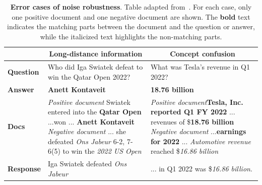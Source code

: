 \documentclass{DESSThesis}
\begin{document}
\begin{table}[h]
    \centering
    \small
    \begin{tabular}{p{1.5cm}|p{6cm}|p{6cm}}
    \toprule
    \multicolumn{1}{c|}{} & \multicolumn{1}{c|}{\textbf{Long-distance information}} & \multicolumn{1}{c}{\textbf{Concept confusion}} \\
    \midrule
    \textbf{Question} & Who did Iga Swiatek defeat to win the Qatar Open 2022? & What was Tesla's revenue in Q1 2022? \\
    \midrule
    \textbf{Answer} & \textbf{Anett Kontaveit} & \textbf{18.76 billion} \\
    \midrule
    \textbf{Docs} & 
    \emph{Positive document}\newline
    Swiatek entered into the \textbf{Qatar Open} ...won ... \textbf{Anett Kontaveit} \newline
    \newline
    \emph{Negative document}\newline
    ... she defeated \emph{Ons Jabeur} 6-2, 7-6(5) to win the \emph{2022 US Open}
    & 
    \emph{Positive document}\newline \textbf{Tesla, Inc. reported Q1 FY 2022} ... revenues of \$\textbf{18.76 billion} \newline
    \newline
    \emph{Negative document}\newline
    ...\textbf{earnings for 2022} ... \emph{Automotive revenue }reached \$\emph{16.86 billion} \\
    \midrule
    \textbf{Response} & Iga Swiatek defeated \emph{Ons Jabeur} & ... in Q1 2022 was \$\emph{16.86 billion}. \\
    \bottomrule
    \end{tabular}
    \caption[Error cases of noise robustness]{\textbf{Error cases of noise robustness}. Table adapted from~\cite{Chen_Lin_Han_Sun_2024}. For each case, only one positive document and one negative document are shown. The \textbf{bold} text indicates the matching parts between the document and the question or answer, while the italicized text highlights the non-matching parts.}
    \label{tab:rag_error_types_adapted}
\end{table}
\end{document}
